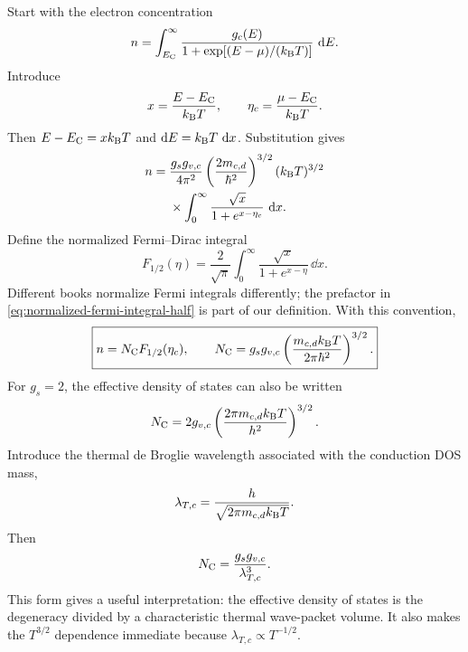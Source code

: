 Start with the electron concentration
\begin{equation}
  n
  =\int_{E_{\mathrm C}}^{\infty}
    \frac{g_c(E)}{1+\exp[(E-\mu)/(k_{\mathrm B} T)]}\,\mathop{}\!\mathrm{d} E.
  \label{eq:exact-electron-integral}
\end{equation}
Introduce
\begin{equation}
  x=\frac{E-E_{\mathrm C}}{k_{\mathrm B} T},
  \qquad
  \eta_c=\frac{\mu-E_{\mathrm C}}{k_{\mathrm B} T}.
  \label{eq:electron-fermi-integral-variables}
\end{equation}
Then $E-E_{\mathrm C}=xk_{\mathrm B} T$ and $\mathop{}\!\mathrm{d} E=k_{\mathrm B} T\,\mathop{}\!\mathrm{d} x$.  Substitution gives
\begin{equation}
\begin{aligned}
  n
  ={}&\frac{g_sg_{v,c}}{4\pi^2}
      \left(\frac{2m_{c,d}}{\hbar^2}\right)^{3/2}
      (k_{\mathrm B} T)^{3/2}\\
     &\times
      \int_0^\infty
      \frac{\sqrt{x}}{1+e^{x-\eta_c}}\,\mathop{}\!\mathrm{d} x.
\end{aligned}
  \label{eq:electron-integral-dimensionless}
\end{equation}
Define the normalized Fermi--Dirac integral
\begin{equation}
  F_{1/2}(\eta)
  =\frac{2}{\sqrt\pi}
   \int_0^\infty
   \frac{\sqrt{x}}{1+e^{x-\eta}}\,\dd x.
  \label{eq:normalized-fermi-integral-half}
\end{equation}
Different books normalize Fermi integrals differently; the prefactor in
\cref{eq:normalized-fermi-integral-half} is part of our definition.  With this
convention,
\begin{equation}
  \boxed{
  n=N_{\mathrm C} F_{1/2}(\eta_c),
  \qquad
  N_{\mathrm C}=g_sg_{v,c}
  \left(\frac{m_{c,d}k_{\mathrm B} T}{2\pi\hbar^2}\right)^{3/2}.
  }
  \label{eq:exact-electron-concentration-fermi-integral}
\end{equation}
For $g_s=2$, the effective density of states can also be written
\begin{equation}
  N_{\mathrm C}
  =2g_{v,c}
   \left(\frac{2\pi m_{c,d}k_{\mathrm B} T}{h^2}\right)^{3/2}.
  \label{eq:conduction-effective-density-h}
\end{equation}
Introduce the thermal de Broglie wavelength associated with the conduction DOS
mass,
\begin{equation}
  \lambda_{T,c}
  =\frac{h}{\sqrt{2\pi m_{c,d}k_{\mathrm B} T}}.
  \label{eq:conduction-thermal-wavelength}
\end{equation}
Then
\begin{equation}
  N_{\mathrm C}=\frac{g_sg_{v,c}}{\lambda_{T,c}^3}.
  \label{eq:effective-density-thermal-volume}
\end{equation}
This form gives a useful interpretation: the effective density of states is the
degeneracy divided by a characteristic thermal wave-packet volume.  It also
makes the $T^{3/2}$ dependence immediate because
$\lambda_{T,c}\propto T^{-1/2}$.


